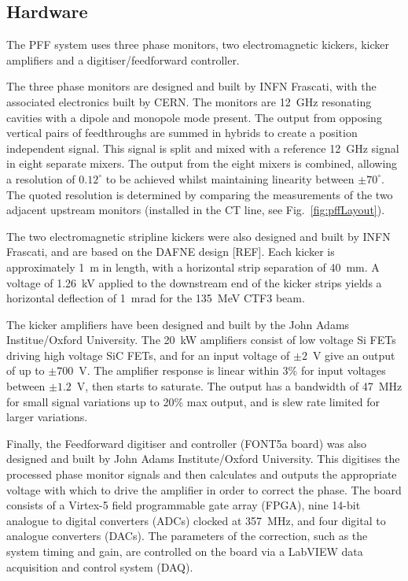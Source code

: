 \documentclass[%
 reprint,
superscriptaddress,
 amsmath,amssymb,
 prl,
]{revtex4-1}
\begin{document}
\subsection{\label{ss:hardware}Hardware}

The PFF system uses three phase monitors, two electromagnetic kickers, kicker 
amplifiers and a digitiser/feedforward controller.

The three phase monitors \cite{phMonEuCard} are designed and built by INFN 
Frascati, with the 
associated electronics built by CERN. The monitors are 12~GHz resonating 
cavities with a dipole and monopole mode present. The output from opposing 
vertical pairs of feedthroughs are summed in hybrids to create a position 
independent signal. This signal is split and mixed with a reference 12~GHz 
signal in eight separate mixers. The output from the eight mixers is combined, 
allowing a resolution of \(0.12^\circ\) to be 
achieved whilst maintaining linearity between \(\pm70^\circ\). 
The quoted resolution is determined by 
comparing the measurements of the two adjacent upstream monitors (installed in 
the CT line, see Fig.~\ref{fig:pffLayout}).


The two electromagnetic stripline kickers \cite{kickerIPAC11} were also 
designed and built by INFN Frascati,  
and are based on the DAFNE design [REF]. Each kicker is approximately 1~m in length, 
with a horizontal strip separation of 40~mm. A voltage of 1.26~kV applied to 
the 
downstream end of the kicker strips yields a horizontal deflection of 1~mrad 
for the 135~MeV CTF3 beam.

The kicker amplifiers \cite{RobertsThesis} have been designed and built by the 
John Adams 
Institue/Oxford University. The 20~kW amplifiers consist of low voltage Si FETs 
driving high voltage SiC FETs, and for 
an input voltage of \(\pm2\)~V give an output of up to \(\pm700\)~V. The 
amplifier response is linear within 
3\% for input voltages between \(\pm1.2\)~V, then starts to saturate. The 
output 
has a bandwidth of 47~MHz for small signal variations up to 20\% max output, 
and is slew rate limited for larger variations.

Finally, the Feedforward digitiser and controller (FONT5a board) 
\cite{RobertsThesis} was also 
designed and built by John Adams Institute/Oxford University. This digitises 
the 
processed phase monitor signals and then calculates and outputs the appropriate 
voltage with which to drive the amplifier in order to correct the phase. The 
board consists of a Virtex-5 field programmable gate array (FPGA), nine 14-bit 
analogue to digital converters (ADCs) clocked at 357~MHz, and four digital to 
analogue converters (DACs). The parameters of the correction, such as the 
system timing and gain, are controlled on the board via a LabVIEW data 
acquisition and control system (DAQ).
\end{document}
